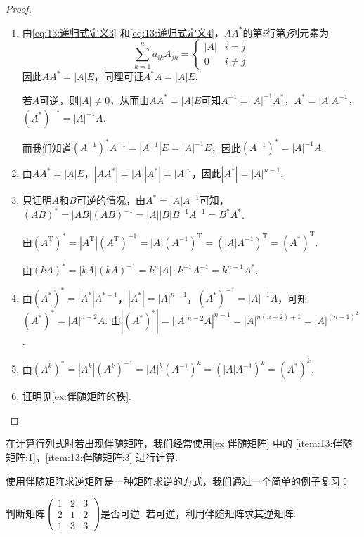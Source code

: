 \begin{proof}
    \begin{enumerate}
        \item 由\autoref{eq:13:递归式定义3} 和\autoref{eq:13:递归式定义4}，$AA^*$的第$i$行第$j$列元素为
              \[\sum_{k=1}^{n}a_{ik}A_{jk}=\begin{cases}
                      |A| & i=j      \\
                      0   & i \neq j
                  \end{cases}\]
              因此$AA^*=|A|E$，同理可证$A^*A=|A|E$.

              若$A$可逆，则$|A| \neq 0$，从而由$AA^*=|A|E$可知$A^{-1}=|A|^{-1}A^*$，$A^*=|A|A^{-1}$，$(A^*)^{-1}=|A|^{-1}A$.

              而我们知道$(A^{-1})^*A^{-1}=|A^{-1}|E=|A|^{-1}E$，因此$(A^{-1})^*=|A|^{-1}A$.

        \item 由$AA^*=|A|E$，$|AA^*|=|A||A^*|=|A|^n$，因此$|A^*|=|A|^{n-1}$.

        \item 只证明$A$和$B$可逆的情况，由$A^*=|A|A^{-1}$可知，$(AB)^*=|AB|(AB)^{-1}=|A||B|B^{-1}A^{-1}=B^*A^*$.

              由$(A^\mathrm{T})^*=|A^\mathrm{T}|(A^\mathrm{T})^{-1}=|A|(A^{-1})^\mathrm{T}=(|A|A^{-1})^\mathrm{T}=(A^*)^\mathrm{T}$.

              由$(kA)^*=|kA|(kA)^{-1}=k^n|A|\cdot k^{-1}A^{-1}=k^{n-1}A^*$.

        \item 由$(A^*)^*=|A^*|A^{*-1}$，$|A^*|=|A|^{n-1}$，$(A^*)^{-1}=|A|^{-1}A$，可知$(A^*)^*=|A|^{n-2}A$. 由$|(A^*)^*|=||A|^{n-2}A|^{n-1}=|A|^{n(n-2)+1}=|A|^{(n-1)^2}$.

        \item 由$(A^k)^*=|A^k|(A^k)^{-1}=|A|^k(A^{-1})^k=(|A|A^{-1})^k=(A^*)^k$.

        \item 证明见\autoref{ex:伴随矩阵的秩}.
    \end{enumerate}
\end{proof}

在计算行列式时若出现伴随矩阵，我们经常使用\autoref{ex:伴随矩阵} 中的 \ref*{item:13:伴随矩阵:1}，\ref*{item:13:伴随矩阵:3} 进行计算.

使用伴随矩阵求逆矩阵是一种矩阵求逆的方式，我们通过一个简单的例子复习：

\begin{example}{}{}
    判断矩阵$\begin{pmatrix}
            1 & 2 & 3 \\ 2 & 1 & 2 \\ 1 & 3 & 3
        \end{pmatrix}$是否可逆. 若可逆，利用伴随矩阵求其逆矩阵.
\end{example}

